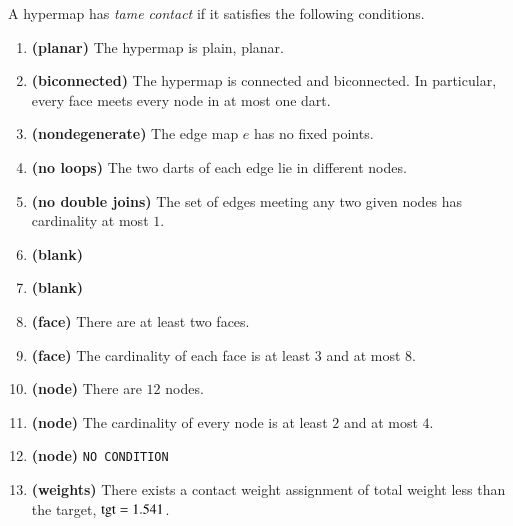 A hypermap has {\it tame contact\/} if it satisfies the following
conditions.
%

\begin{enumerate}
    \item {\bf (planar)} The hypermap is plain, planar.
    \item {\bf (biconnected)} The hypermap is connected and biconnected.  In particular, every face meets every node in at most one dart.
    \item {\bf (nondegenerate)} The edge map $e$ has no fixed points.
    \item {\bf (no loops)} The two darts of each edge lie in different nodes.
    \item {\bf (no double joins)} The set of edges meeting any two given nodes has cardinality at most $1$.
      \item{\bf (blank)}
    \item {\bf (blank)}
  \item {\bf (face)} There are at least two faces.
    \item {\bf (face)} The cardinality of each face is at least $3$ and at most $8$.
    \item {\bf (node)} There are $12$ nodes.
    \item {\bf (node)} The cardinality of every node is at least $2$ and at most    $4$.
    \item {\bf (node)} {\tt NO CONDITION}
    \item {\bf (weights)} There exists a contact weight assignment
        of total weight less than the target, ${\operatorname{tgt}}=1.541$.
\end{enumerate}
%

